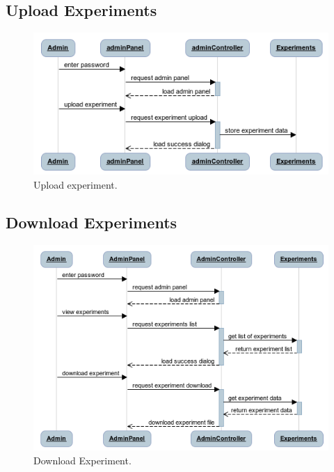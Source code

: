 \documentclass[a4paper,12pt,oneside]{report}
\begin{document}
\subsection{Upload Experiments}
\begin{figure}[!hp]
  \begin{center}
   \includegraphics[width=11.5cm]{pics/upload_experiments.png}
  \end{center}
\caption{Upload experiment.}
\end{figure}


\subsection{Download Experiments}
\begin{figure}[!hp]
  \begin{center}
   \includegraphics[width=11.5cm]{pics/download_experiments.png}
  \end{center}
\caption{Download Experiment.}
\end{figure}
\end{document}

